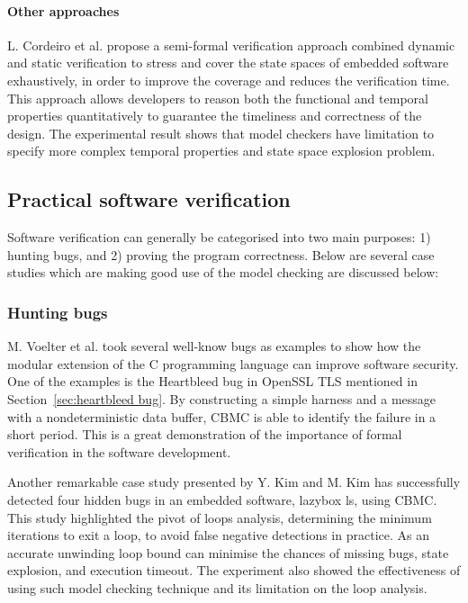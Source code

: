 \paragraph{Other approaches} L. Cordeiro et al. \cite{5066674} propose a semi-formal verification approach combined dynamic and static verification to stress and cover the state spaces of embedded software exhaustively, in order to improve the coverage and reduces the verification time. This approach allows developers to reason both the functional and temporal properties quantitatively to guarantee the timeliness and correctness of the design. The experimental result shows that model checkers have  limitation to specify more complex temporal properties and state space explosion problem.

\subsection{Practical software verification}
Software verification can generally be categorised into two main purposes: 1) hunting bugs, and 2) proving the program correctness. Below are several case studies which are making good use of the model checking are discussed below:

\subsubsection{Hunting bugs}
M. Voelter et al.\cite{Voelter:2015:TIS:2846696.2846698} took several well-know bugs as examples to show how the modular extension of the C programming language can improve software security. One of the examples is the Heartbleed bug in OpenSSL TLS mentioned in Section~\ref{sec:heartbleed bug}. By constructing a simple harness and a message with a nondeterministic data buffer, CBMC is able to identify the failure in a short period. This is a great demonstration of the importance of formal verification in the software development. 

Another remarkable case study presented by Y. Kim and M. Kim \cite{7091291} has successfully detected four hidden bugs in an embedded software, lazybox ls, using CBMC. This study highlighted the pivot of loops analysis, determining the minimum iterations to exit a loop, to avoid false negative detections in practice. As an accurate unwinding loop bound can minimise the chances of missing bugs, state explosion, and execution timeout. The experiment also showed the effectiveness of using such model checking technique and its limitation on the loop analysis. 

